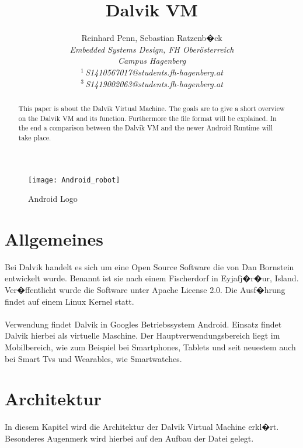 \documentclass[11pt,conference,a4paper]{IEEEtran}
\title{Dalvik VM}
\author{%
{Reinhard Penn, Sebastian Ratzenb�ck}%
\vspace{1.6mm}\\
\fontsize{10}{10}\selectfont\itshape
Embedded Systems Design, FH Oberösterreich\\
Campus Hagenberg\\
\fontsize{9}{9}\selectfont\ttfamily\upshape
%
$^{1}$\,S1410567017@students.fh-hagenberg.at\\
$^{3}$\,S1419002063@students.fh-hagenberg.at%
\vspace{1.2mm}\\
}
\begin{document}
\maketitle
%
\begin{abstract}
This paper is about the Dalvik Virtual Machine. The goals are to give a short overview on the Dalvik VM and its function. Furthermore the  file format will be explained. In the end a comparison between the Dalvik VM and the newer Android Runtime will take place.
\end{abstract}

%
\begin{figure}
\centering
\texttt{[image: Android\_robot]}
\caption{Android Logo\cite{6}}
\label{fig:Android_robot}
\end{figure}

\section{Allgemeines\cite{3}}
Bei Dalvik handelt es sich um eine Open Source Software die von Dan Bornstein entwickelt wurde. Benannt ist sie nach einem Fischerdorf in Eyjafj�r�ur, Island. Ver�ffentlicht wurde die Software unter Apache License 2.0. Die Ausf�hrung findet auf einem Linux Kernel statt.
\\
\\
Verwendung findet Dalvik in Googles Betriebssystem Android. Einsatz findet Dalvik hierbei als virtuelle Maschine. Der Hauptverwendungsbereich liegt im Mobilbereich, wie zum Beispiel bei Smartphones, Tablets und seit neuestem auch bei Smart Tvs und Wearables, wie Smartwatches.


\section{Architektur\cite{2}}
In diesem Kapitel wird die Architektur der Dalvik Virtual Machine erkl�rt. Besonderes Augenmerk wird hierbei auf den Aufbau der  Datei gelegt.
\end{document}
